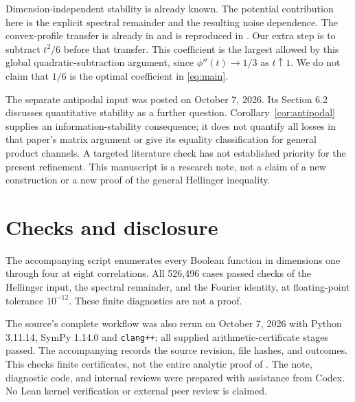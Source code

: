 \documentclass[11pt]{article}
\begin{document}
Dimension-independent stability is already known. The potential
contribution here is the explicit spectral remainder and the resulting
noise dependence. The convex-profile transfer is already in
\cite{ABCJN} and is reproduced in \cite{source}. Our extra step is to
subtract $t^2/6$ before that transfer. This coefficient is the largest
allowed by this global quadratic-subtraction argument, since
$\phi''(t)\to1/3$ as $t\uparrow1$. We do not claim that $1/6$ is
the optimal coefficient in \eqref{eq:main}.

The separate antipodal input \cite{Ky} was posted on October 7, 2026.
Its Section 6.2 discusses quantitative stability as a further question.
Corollary~\ref{cor:antipodal} supplies an information-stability
consequence; it does not quantify all losses in that paper's matrix
argument or give its equality classification for general product channels.
A targeted literature check has not established priority for the present
refinement. This manuscript is a research note, not a claim of a new
construction or a new proof of the general Hellinger inequality.

\section{Checks and disclosure}
The accompanying script  enumerates
every Boolean function in dimensions one through four at eight
correlations. All 526,496 cases passed checks of the Hellinger input,
the spectral remainder, and the Fourier identity, at floating-point
tolerance $10^{-12}$. These finite diagnostics are not a proof.

The source's complete  workflow was
also rerun on October 7, 2026 with Python 3.11.14, SymPy 1.14.0 and
\texttt{clang++}; all supplied arithmetic-certificate stages passed.
The accompanying  records the
source revision, file hashes, and outcomes. This checks finite
certificates, not the entire analytic proof of \cite{source}.
The note, diagnostic code, and internal reviews were prepared with
assistance from Codex. No Lean kernel verification or external peer
review is claimed.
\end{document}
